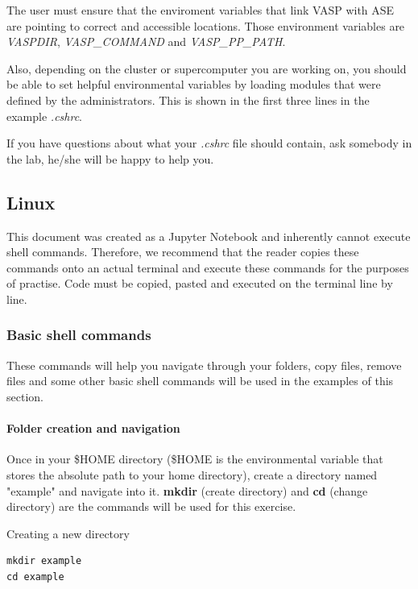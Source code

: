 \documentclass[11pt]{article}
\begin{document}
    The user must ensure that the enviroment variables that link VASP with
ASE are pointing to correct and accessible locations. Those environment
variables are \emph{VASPDIR}, \emph{VASP\_COMMAND} and
\emph{VASP\_PP\_PATH}.

Also, depending on the cluster or supercomputer you are working on, you
should be able to set helpful environmental variables by loading modules
that were defined by the administrators. This is shown in the first
three lines in the example \emph{.cshrc}.

If you have questions about what your \emph{.cshrc} file should contain,
ask somebody in the lab, he/she will be happy to help you.

    \subsection{Linux}\label{linux}

This document was created as a Jupyter Notebook and inherently cannot
execute shell commands. Therefore, we recommend that the reader copies
these commands onto an actual terminal and execute these commands for
the purposes of practise. Code must be copied, pasted and executed on
the terminal line by line.

\subsubsection{Basic shell commands}\label{basic-shell-commands}

These commands will help you navigate through your folders, copy files,
remove files and some other basic shell commands will be used in the
examples of this section.

\paragraph{Folder creation and
navigation}\label{folder-creation-and-navigation}

Once in your \$HOME directory (\$HOME is the environmental variable that
stores the absolute path to your home directory), create a directory
named "example" and navigate into it. \textbf{mkdir} (create directory)
and \textbf{cd} (change directory) are the commands will be used for
this exercise.

Creating a new directory

\begin{verbatim}
mkdir example
cd example
\end{verbatim}
\end{document}

